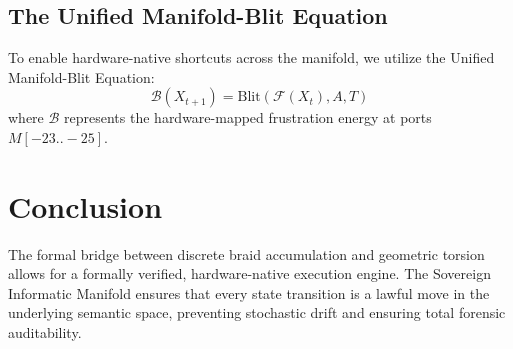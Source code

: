 \documentclass[11pt,a4paper]{article}
\begin{document}
\subsection{The Unified Manifold-Blit Equation}
To enable hardware-native shortcuts across the manifold, we utilize the Unified Manifold-Blit Equation:
\begin{equation}
    \mathcal{B}(X_{t+1}) = \text{Blit}(\mathcal{F}(X_t), A, T)
\end{equation}
where $\mathcal{B}$ represents the hardware-mapped frustration energy at ports $M[-23..-25]$.

\section{Conclusion}
The formal bridge between discrete braid accumulation and geometric torsion allows for a formally verified, hardware-native execution engine. The Sovereign Informatic Manifold ensures that every state transition is a lawful move in the underlying semantic space, preventing stochastic drift and ensuring total forensic auditability.
\end{document}
